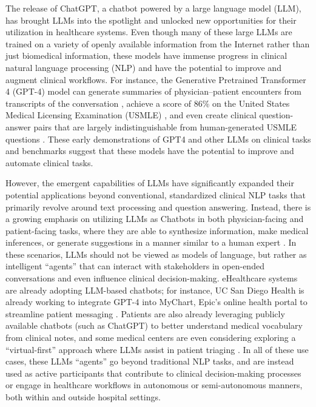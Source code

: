 \documentclass[10pt]{article}
\begin{document}
\vspace{12pt}
\begin{multicols}{2}
The release of ChatGPT, a chatbot powered by a large language model (LLM), has brought LLMs into the spotlight and unlocked new opportunities for their utilization in healthcare systems. Even though many of these large LLMs are trained on a variety of openly available information from the Internet rather than just biomedical information, these models have immense progress in clinical natural language processing (NLP) \cite{agrawal2022large,brown2020language,bubeck2023sparks} and have the potential to improve and augment clinical workflows.  For instance, the Generative Pretrained Transformer 4 (GPT-4) model can generate summaries of physician–patient encounters from transcripts of the conversation \cite{lee2023benefits}, achieve a score of 86\% on the United States Medical Licensing Examination (USMLE) \cite{fleming2023assessing}, and even create clinical question-answer pairs that are largely indistinguishable from human-generated USMLE questions \cite{nori2023capabilities}. These early demonstrations of GPT4 and other LLMs on clinical tasks and benchmarks suggest that these models have the potential to improve and automate clinical tasks.  

However, the emergent capabilities of LLMs have significantly expanded their potential applications beyond conventional, standardized clinical NLP tasks that primarily revolve around text processing and question answering. Instead, there is a growing emphasis on utilizing LLMs as Chatbots in both physician-facing and patient-facing tasks, where they are able to synthesize information, make medical inferences, or generate suggestions in a manner similar to a human expert  \cite{lee2023benefits,dash2023evaluation,wornow2023shaky}. In these scenarios, LLMs should not be viewed as models of language, but rather as intelligent “agents” that can interact with stakeholders in open-ended conversations and even influence clinical decision-making. eHealthcare systems are already adopting LLM-based chatbots; for instance, UC San Diego Health is already working to integrate GPT-4 into MyChart, Epic’s online health portal to streamline patient messaging \cite{DrChatbot}. Patients are also already leveraging publicly available chatbots (such as ChatGPT) to better understand medical vocabulary from clinical notes, and some medical centers are even considering exploring a “virtual-first” approach where LLMs assist in patient triaging \cite{levine2023diagnostic,korngiebel2021considering}. In all of these use cases, these LLMs “agents” go beyond traditional NLP tasks, and are instead used as active participants that contribute to clinical decision-making processes or engage in healthcare workflows in autonomous or semi-autonomous manners, both within and outside hospital settings. 


\end{multicols}
\end{document}
